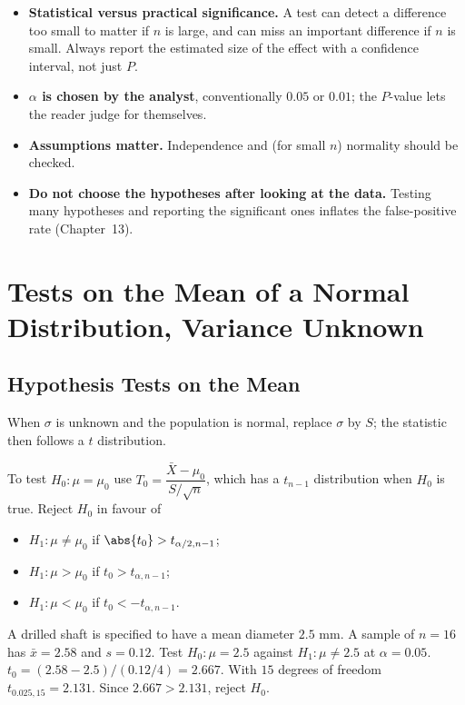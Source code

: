 \begin{itemize}
  \item \textbf{Statistical versus practical significance.} A test can detect a difference too small to matter if $n$ is large, and can miss an important difference if $n$ is small. Always report the estimated size of the effect with a confidence interval, not just $P$.
  \item \textbf{$\alpha$ is chosen by the analyst}, conventionally $0.05$ or $0.01$; the $P$-value lets the reader judge for themselves.
  \item \textbf{Assumptions matter.} Independence and (for small $n$) normality should be checked.
  \item \textbf{Do not choose the hypotheses after looking at the data.} Testing many hypotheses and reporting the significant ones inflates the false-positive rate (Chapter~13).
\end{itemize}

\section{Tests on the Mean of a Normal Distribution, Variance Unknown}

\subsection{Hypothesis Tests on the Mean}

When $\sigma$ is unknown and the population is normal, replace $\sigma$ by $S$; the statistic then follows a $t$ distribution.

\begin{theorem}\label{thm:ttest}
To test $H_0:\mu=\mu_0$ use $T_0=\dfrac{\bar{X}-\mu_0}{S/\sqrt n}$, which has a $t_{n-1}$ distribution when $H_0$ is true. Reject $H_0$ in favour of
\begin{itemize}
  \item $H_1:\mu\ne\mu_0$ if $\abs{t_0}>t_{\alpha/2,n-1}$;
  \item $H_1:\mu>\mu_0$ if $t_0>t_{\alpha,n-1}$;
  \item $H_1:\mu<\mu_0$ if $t_0<-t_{\alpha,n-1}$.
\end{itemize}
\end{theorem}

\begin{example}\label{ex:ttest}
A drilled shaft is specified to have a mean diameter $2.5$ mm. A sample of $n=16$ has $\bar{x}=2.58$ and $s=0.12$. Test $H_0:\mu=2.5$ against $H_1:\mu\ne2.5$ at $\alpha=0.05$. $t_0=(2.58-2.5)/(0.12/4)=2.667$. With $15$ degrees of freedom $t_{0.025,15}=2.131$. Since $2.667>2.131$, reject $H_0$.
\end{example}

